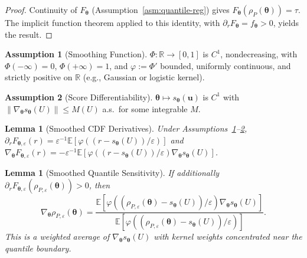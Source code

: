 \documentclass[11pt]{article}
\newcommand{\R}{\mathbb{R}}
\newcommand{\E}{\mathbb{E}}
\newcommand{\norm}[1]{\|#1\|}
\newcommand{\btheta}{\bm{\theta}}
\newcommand{\bu}{\bm{u}}
\newtheorem{lemma}[theorem]{Lemma}
\theoremstyle{definition}
\newtheorem{assumption}{Assumption}
\begin{document}
\begin{proof}
Continuity of $F_{\btheta}$ (Assumption~\ref{asm:quantile-reg}) gives $F_{\btheta}(\rho_P(\btheta))=\tau$. The implicit function theorem applied to this identity, with $\partial_r F_{\btheta}=f_{\btheta}>0$, yields the result.
\end{proof}

\begin{assumption}[Smoothing Function]\label{asm:smoothing}
$\Phi: \R \to [0,1]$ is $C^1$, nondecreasing, with $\Phi(-\infty)=0$, $\Phi(+\infty)=1$, and $\varphi := \Phi'$ bounded, uniformly continuous, and strictly positive on $\R$ (e.g., Gaussian or logistic kernel).
\end{assumption}

\begin{assumption}[Score Differentiability]\label{asm:score-diff}
$\btheta \mapsto s_{\btheta}(\bu)$ is $C^1$ with $\norm{\nabla_{\btheta} s_{\btheta}(U)} \leq M(U)$ a.s.\ for some integrable $M$.
\end{assumption}

\begin{lemma}[Smoothed CDF Derivatives]\label{lem:smoothed-derivatives}
Under Assumptions~\ref{asm:smoothing}--\ref{asm:score-diff}, $\partial_r F_{\btheta,\varepsilon}(r) = \varepsilon^{-1}\E[\varphi((r-s_{\btheta}(U))/\varepsilon)]$ and $\nabla_{\btheta} F_{\btheta,\varepsilon}(r) = -\varepsilon^{-1}\E[\varphi((r-s_{\btheta}(U))/\varepsilon)\nabla_{\btheta} s_{\btheta}(U)]$.
\end{lemma}

\begin{lemma}[Smoothed Quantile Sensitivity]\label{lem:smoothed-quantile-deriv}
If additionally $\partial_r F_{\btheta,\varepsilon}(\rho_{P,\varepsilon}(\btheta)) > 0$, then
\begin{equation}\label{eq:rhoeps-deriv}
\nabla_{\btheta} \rho_{P,\varepsilon}(\btheta) = \frac{\E[\varphi((\rho_{P,\varepsilon}(\btheta) - s_{\btheta}(U))/\varepsilon) \nabla_{\btheta} s_{\btheta}(U)]}{\E[\varphi((\rho_{P,\varepsilon}(\btheta) - s_{\btheta}(U))/\varepsilon)]}.
\end{equation}
This is a weighted average of $\nabla_{\btheta}s_{\btheta}(U)$ with kernel weights concentrated near the quantile boundary.
\end{lemma}
\end{document}
